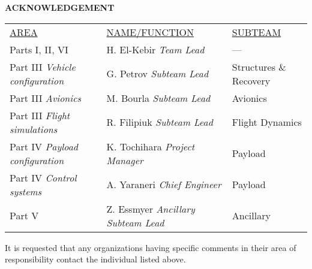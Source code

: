 
\begin{center}
	{\Large\textbf{ACKNOWLEDGEMENT}}\\
	\begin{minipage}[H]{0.75\linewidth}
		\begin{table}[H]
			\begin{tabularx}{\linewidth}{X X l}
				\underline{AREA} & \underline{NAME/FUNCTION} & \underline{SUBTEAM} \\[.75em]
				Parts I, II, VI & H. El-Kebir \newline \textit{Team Lead} & --- \\[1.5em]
				Part III \newline \textit{Vehicle configuration} & G. Petrov \newline \textit{Subteam Lead} & Structures \& Recovery \\[1.5em]
				Part III  \newline \textit{Avionics} & M. Bourla \newline \textit{Subteam Lead} & Avionics \\[1.5em]
				Part III  \newline \textit{Flight simulations} & R. Filipiuk \newline \textit{Subteam Lead} & Flight Dynamics \\[1.5em]
				Part IV \newline \textit{Payload configuration} & K. Tochihara \newline \textit{Project Manager} & Payload \\[1.5em]
				Part IV \newline \textit{Control systems} & A. Yaraneri \newline \textit{Chief Engineer} & Payload \\[1.5em]
				Part V & Z. Essmyer \newline \textit{Ancillary Subteam Lead} & Ancillary
			\end{tabularx}
		\end{table}
	
	
		It is requested that any organizations having specific comments in their area of responsibility contact the individual listed above.
	\end{minipage}
\end{center}
\vfill

\newpage
